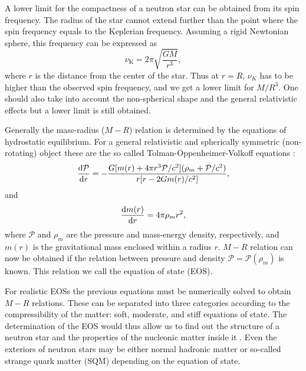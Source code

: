 \documentclass{wihuri}
\def\be{\begin{equation}}
\def\ee{\end{equation}}
\def\d{{\rm d}}
\begin{document}
A lower limit for the compactness of a neutron star can be obtained from its spin frequency. The radius of the star cannot extend further than the point where the spin frequency equals to the Keplerian frequency. Assuming a rigid Newtonian sphere, this frequency can be expressed as
\be \label{eq:keplerian}
\nu_{\mathrm{K}} = 2 \pi \sqrt{\frac{GM}{r^{3}}},
\ee 
where $r$ is the distance from the center of the star. Thus at $r=R$, $\nu_{K}$ has to be higher than the observed spin frequency, and we get a lower limit for $M/R^{3}$. One should also take into account the non-spherical shape and the general relativistic effects but a lower limit is still obtained.








Generally the mass-radius ($M-R$) relation is determined by the equations of hydrostatic equilibrium. For a general relativistic and spherically symmetric (non-rotating) object %
these are the so called Tolman-Oppenheimer-Volkoff equations %
\cite{tolman}\cite{oppenheimer}:
\be
 \frac{\d \mathcal{P}}{\d r} = -\frac{G[m(r)+4 \pi r^{3}\mathcal{P}/c^{2}](\rho_{m} + \mathcal{P}/c^{2})}{r[r-2Gm(r)/c^{2}]},
\ee 
and
\be
 \frac{\d m(r)}{\d r } = 4 \pi \rho_{m} r^{2},
\ee
where $\mathcal{P}$ and $\rho_{m}$ are the pressure and mass-energy density, respectively, and $m(r)$ is the gravitational mass enclosed within a radius $r$. $M-R$ relation can now be obtained if the relation between pressure and density $\mathcal{P}=\mathcal{P}(\rho_{m})$ is known. This relation we call the equation of state (EOS). 


For realistic EOSs the previous equations must be numerically solved to obtain $M-R$ relations. These can be separated into three categories according to the compressibility of the matter: soft, moderate, and stiff equations of state. The determination of the EOS would thus allow us to find out the structure of a neutron star and the properties of the nucleonic matter inside it \cite{akmal}. Even the exteriors of neutron stars may be either normal hadronic matter or so-called strange quark matter (SQM) depending on the equation of state.  
\end{document}

